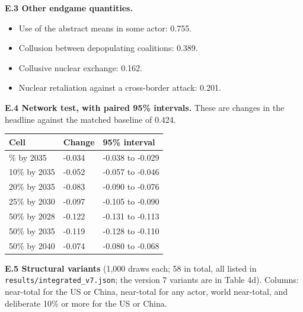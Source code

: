 \documentclass[
  10pt,
]{article}
\newcounter{none} %
\providecommand{\tightlist}{%
  \setlength{\itemsep}{0pt}\setlength{\parskip}{0pt}}
\begin{document}
\textbf{E.3 Other endgame quantities.}

\begin{itemize}
\tightlist
\item
  Use of the abstract means in some actor: 0.755.
\item
  Collusion between depopulating coalitions: 0.389.
\item
  Collusive nuclear exchange: 0.162.
\item
  Nuclear retaliation against a cross-border attack: 0.201.
\end{itemize}

\textbf{E.4 Network test, with paired 95\% intervals.} These are changes in the headline against the
matched baseline of 0.424.

{\def\LTcaptype{none} %
\begin{longtable}[]{@{}lll@{}}
\toprule\noalign{}
Cell & Change & 95\% interval \\
\midrule\noalign{}
\endhead
\bottomrule\noalign{}
\endlastfoot
5\% by 2035 & -0.034 & -0.038 to -0.029 \\
10\% by 2035 & -0.052 & -0.057 to -0.046 \\
20\% by 2035 & -0.083 & -0.090 to -0.076 \\
25\% by 2030 & -0.097 & -0.105 to -0.090 \\
50\% by 2028 & -0.122 & -0.131 to -0.113 \\
50\% by 2035 & -0.119 & -0.128 to -0.110 \\
50\% by 2040 & -0.074 & -0.080 to -0.068 \\
\end{longtable}
}

\textbf{E.5 Structural variants} (1,000 draws each; 58 in total, all listed in
\texttt{results/integrated\_v7.json}; the version 7 variants are in Table 4d). Columns: near-total
for the US or China, near-total for any actor, world near-total, and deliberate 10\% or more for the
US or China.
\end{document}
